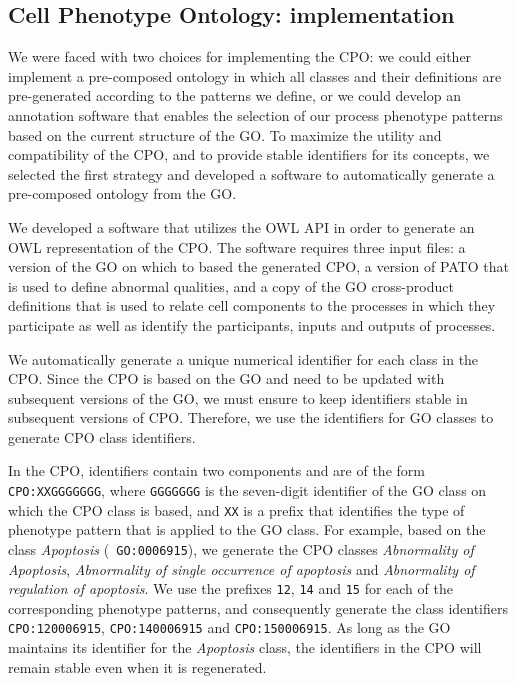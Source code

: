 \documentclass{bioinfo}
\renewcommand{\cite}{\citep}
\begin{document}
\subsection{Cell Phenotype Ontology: implementation}
We were faced with two choices for implementing the CPO: we could
either implement a pre-composed ontology in which all classes and
their definitions are pre-generated according to the patterns we
define, or we could develop an annotation software that enables the
selection of our process phenotype patterns based on the current
structure of the GO.  To maximize the utility and compatibility of the
CPO, and to provide stable identifiers for its concepts, we selected
the first strategy and developed a software to automatically generate
a pre-composed ontology from the GO.

We developed a software that utilizes the OWL API \cite{Horridge2007}
in order to generate an OWL representation of the CPO. The software
requires three input files: a version of the GO on which to based the
generated CPO, a version of PATO that is used to define abnormal
qualities, and a copy of the GO cross-product definitions
\cite{Mungall2010go} that is used to relate cell components to the
processes in which they participate as well as identify the
participants, inputs and outputs of processes.

We automatically generate a unique numerical identifier for each class
in the CPO.  Since the CPO is based on the GO and need to be updated
with subsequent versions of the GO, we must ensure to keep identifiers
stable in subsequent versions of CPO. Therefore, we use the
identifiers for GO classes to generate CPO class identifiers.

In the CPO, identifiers contain two components and are of the form
{\tt CPO:XXGGGGGGG}, where {\tt GGGGGGG} is the seven-digit identifier
of the GO class on which the CPO class is based, and {\tt XX} is a
prefix that identifies the type of phenotype pattern that is applied
to the GO class. For example, based on the class {\em Apoptosis} ({\tt
  GO:0006915}), we generate the CPO classes {\em Abnormality of
  Apoptosis}, {\em Abnormality of single occurrence of apoptosis} and
{\em Abnormality of regulation of apoptosis}.  We use the prefixes
{\tt 12}, {\tt 14} and {\tt 15} for each of the corresponding
phenotype patterns, and consequently generate the class identifiers
{\tt CPO:120006915}, {\tt CPO:140006915} and {\tt CPO:150006915}. As
long as the GO maintains its identifier for the {\em Apoptosis} class,
the identifiers in the CPO will remain stable even when it is
regenerated.
\end{document}
